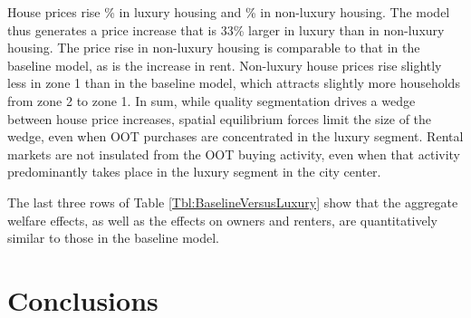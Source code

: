 \documentclass[letterpaper,12pt,dvipsnames,usenames]{article}
\theoremstyle{definition}
\begin{document}
\begin{spacing}{1.25}
{\begin{table}
\begin{center}
{\begin{tabular}{|l|cc|ccc|}
\end{tabular}
}
\end{center}
\end{table}


House prices rise {}\% in  luxury housing and {}\% in non-luxury housing. The model thus generates a price increase that is 33\% larger in luxury than in non-luxury housing. The price rise in non-luxury housing is comparable to that in the baseline model, as is the increase in rent. Non-luxury house prices rise slightly less in zone 1 than in the baseline model, which attracts slightly more households from zone 2 to zone 1. In sum, while quality segmentation drives a wedge between house price increases, spatial equilibrium forces limit the size of the wedge, even when OOT purchases are concentrated in the luxury segment. Rental markets are not insulated from the OOT buying activity, even when that activity predominantly takes place in the luxury segment in the city center.

The last three rows of Table \ref{Tbl:BaselineVersusLuxury} show that the aggregate welfare effects, as well as the effects on owners and renters, are quantitatively similar to those in the baseline model.


\section{Conclusions}


}
\end{spacing}
\end{document}
